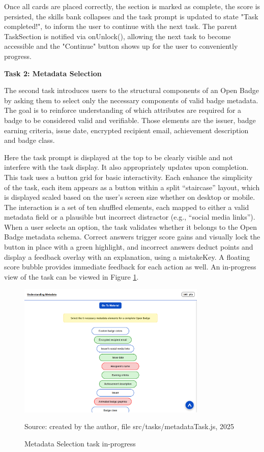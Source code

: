 Once all cards are placed correctly, the section is marked as complete, the score is persisted, the skills bank collapses and the task prompt is updated to state "Task completed!", to inform the user to continue with the next task. 
The parent TaskSection is notified via onUnlock(), allowing the next task to become accessible and the "Continue" button shows up for the user to conveniently progress.


\textbf{Task 2: Metadata Selection}

The second task introduces users to the structural components of an Open Badge by asking them to select only the necessary components of valid badge metadata. 
The goal is to reinforce understanding of which attributes are required for a badge to be considered valid and verifiable. 
Those elements are the issuer, badge earning criteria, issue date, encrypted recipient email, achievement description and badge class.

Here the task prompt is displayed at the top to be clearly visible and not interfere with the task display. 
It also appropriately updates upon completion.
This task uses a button grid for basic interactivity. 
Each enhance the simplicity of the task, each item appears as a button within a split “staircase” layout, which is displayed scaled based on the user's screen size whether on desktop or mobile.
The interaction is a set of ten shuffled elements, each mapped to either a valid metadata field or a plausible but incorrect distractor (e.g., “social media links”). 
When a user selects an option, the task validates whether it belongs to the Open Badge metadata schema. 
Correct answers trigger score gains and visually lock the button in place with a green highlight, and incorrect answers deduct points and display a feedback overlay with an explanation, using a mistakeKey.
A floating score bubble provides immediate feedback for each action as well.
An in-progress view of the task can be viewed in Figure \ref{fig:metadataTask}.

\begin{figure}[hbtp]
\centering
\includegraphics[width=0.8\textwidth]{Media/metadata.png}
\caption{Metadata Selection task in-progress}
\label{fig:metadataTask}
{\raggedright \small{Source: created by the author, file src/tasks/metadataTask.js}, 2025\par}
\end{figure}

